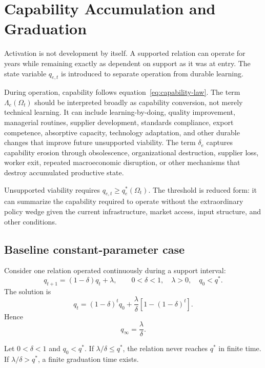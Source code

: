 \section{Capability Accumulation and Graduation}
\label{sec:graduation}

Activation is not development by itself. A supported relation can operate for years while remaining exactly as dependent on support as it was at entry. The state variable $q_{e,t}$ is introduced to separate operation from durable learning.

During operation, capability follows equation~\eqref{eq:capability-law}. The term $\Lambda_e(\Omega_t)$ should be interpreted broadly as capability conversion, not merely technical learning. It can include learning-by-doing, quality improvement, managerial routines, supplier development, standards compliance, export competence, absorptive capacity, technology adaptation, and other durable changes that improve future unsupported viability. The term $\delta_e$ captures capability erosion through obsolescence, organizational destruction, supplier loss, worker exit, repeated macroeconomic disruption, or other mechanisms that destroy accumulated productive state.

Unsupported viability requires $q_{e,t}\ge q_e^*(\Omega_t)$. The threshold is reduced form: it can summarize the capability required to operate without the extraordinary policy wedge given the current infrastructure, market access, input structure, and other conditions.

\subsection{Baseline constant-parameter case}

Consider one relation operated continuously during a support interval:
\begin{equation}
q_{t+1}=(1-\delta)q_t+\lambda,
\qquad
0<\delta<1,
\quad \lambda>0,
\quad q_0<q^*.
\label{eq:baseline}
\end{equation}
The solution is
\begin{equation}
q_t
=(1-\delta)^tq_0
+\frac{\lambda}{\delta}
\left[1-(1-\delta)^t\right].
\label{eq:closed-form}
\end{equation}
Hence
\begin{equation}
q_\infty=\frac{\lambda}{\delta}.
\end{equation}

\begin{proposition}
\label{prop:graduation}
Let $0<\delta<1$ and $q_0<q^*$. If $\lambda/\delta\le q^*$, the relation never reaches $q^*$ in finite time. If $\lambda/\delta>q^*$, a finite graduation time exists.
\end{proposition}

